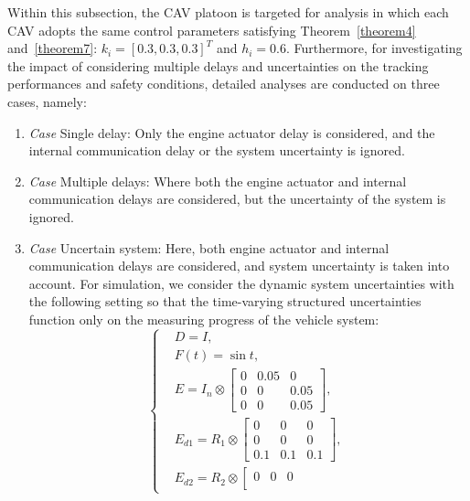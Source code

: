 \documentclass[journal]{IEEEtran}
\begin{document}
Within this subsection, the CAV platoon is targeted for analysis in which each CAV adopts the same control parameters satisfying Theorem~\ref{theorem4} and~\ref{theorem7}: $k_i=[0.3,0.3,0.3]^T$ and $h_i=0.6$. Furthermore, for investigating the impact of considering multiple delays and uncertainties on the tracking performances and safety conditions, detailed analyses are conducted on three cases, namely:
\begin{enumerate}

  \item \textit{Case \uppercase\expandafter{}} Single delay: Only the engine actuator delay is considered, and the internal communication delay or the system uncertainty is ignored.
  \item \textit{Case \uppercase\expandafter{}} Multiple delays: Where both the engine actuator and internal communication delays are considered, but the uncertainty of the system is ignored.
  \item \textit{Case \uppercase\expandafter{}} Uncertain system: Here, both engine actuator and internal communication delays are considered, and system uncertainty is taken into account. For simulation, we consider the dynamic system uncertainties with the following setting so that the time-varying structured uncertainties function only on the measuring progress of the vehicle system:
        \begin{equation*}
          \left\{ \begin{aligned}
            & D=I, \\
            & F(t)=\sin t ,\\
            & E=I_n \otimes\left[\begin{array}{ccc}
            0 & 0.05 & 0 \\
            0 & 0 & 0.05 \\
            0 & 0 & 0.05
            \end{array}\right], \\
            & E_{d 1}=R_1 \otimes\left[\begin{array}{ccc}
            0 & 0 & 0 \\
            0 & 0 & 0 \\
            0.1 & 0.1 & 0.1
            \end{array}\right] \text {, } \\
            & E_{d 2}=R_2 \otimes\left[\begin{array}{ccc}
            0 & 0 & 0 \\

\end{array}
\end{aligned}
\end{equation*}
\end{enumerate}
\end{document}
